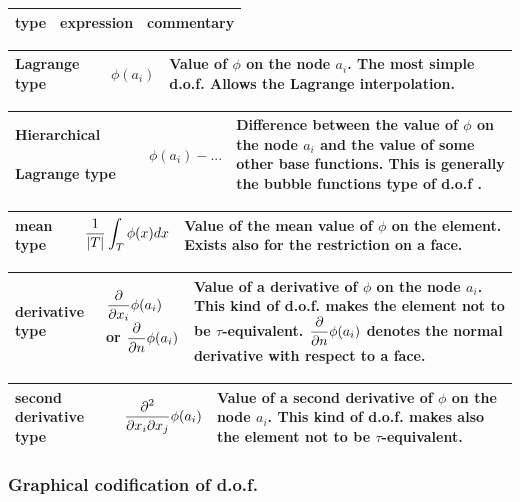 \documentclass[10pt,a4paper]{article}
\begin{document}
\begin{center}
\begin{tabular}{|m{3cm}|m{3cm}|m{8cm}|} \hline 
type & expression  & commentary \\ \hline
\end{tabular}
\begin{tabular}{|m{3cm}|m{3cm}|m{8cm}|} \hline
Lagrange type & $\phi(a_i)$ & Value of $\phi$ on the node $a_i$. The most simple d.o.f. Allows the Lagrange interpolation. \\ \hline
\end{tabular}
\begin{tabular}{|m{3cm}|m{3cm}|m{8cm}|} \hline
Hierarchical ~~~~~~~ Lagrange type & $\phi(a_i) - ...$ & Difference between the value of $\phi$ on the node $a_i$ and the value of some other base functions. This is generally the bubble functions type of d.o.f . \\ \hline
\end{tabular}
\begin{tabular}{|m{3cm}|m{3cm}|m{8cm}|} \hline
mean type & ${\displaystyle \frac{\displaystyle 1}{\displaystyle |T|}}\displaystyle \int_T \phi(x) dx$ & Value of the mean value of $\phi$ on the element. Exists also for the restriction on a face.\\ \hline
\end{tabular}
\begin{tabular}{|m{3cm}|m{3cm}|m{8cm}|} \hline
derivative type & ${\displaystyle \frac{\displaystyle \partial}{\displaystyle \partial x_i}}\phi(a_i)$ or ${\displaystyle \frac{\displaystyle \partial}{\displaystyle \partial n}}\phi(a_i)$ & Value of a derivative of $\phi$ on the node $a_i$. This kind of d.o.f. makes the element not to be $\tau$-equivalent. ${\displaystyle \frac{\displaystyle \partial}{\displaystyle \partial n}}\phi(a_i)$ denotes the normal derivative with respect to a face.\\ \hline
\end{tabular}
\begin{tabular}{|m{3cm}|m{3cm}|m{8cm}|} \hline
second derivative type & ${\displaystyle \frac{\displaystyle \partial^2}{\displaystyle \partial x_i\partial x_j}}\phi(a_i)$  & Value of a second derivative of $\phi$ on the node $a_i$. This kind of d.o.f. makes also the element not to be $\tau$-equivalent.\\ \hline
\end{tabular}

\end{center}

\subsubsection{Graphical codification of d.o.f.}
\end{document}

